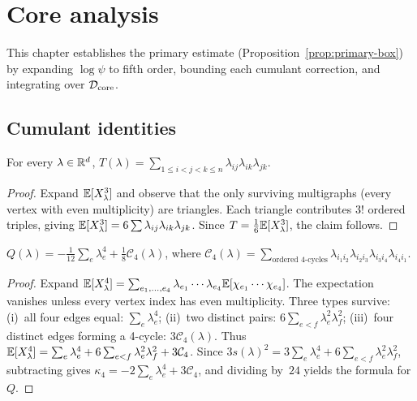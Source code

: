 \chapter{Core analysis}\label{chap:core}

This chapter establishes the primary estimate
(Proposition~\ref{prop:primary-box}) by expanding $\log\psi$ to fifth
order, bounding each cumulant correction, and integrating over $\mathcal{D}_\mathrm{core}$.

\section{Cumulant identities}

\begin{lemma}\label{lem:triangle}
\leanok
For every $\lambda\in\mathbb{R}^d$,
$T(\lambda)=\sum_{1\le i<j<k\le n}\lambda_{ij}\lambda_{ik}\lambda_{jk}$.
\end{lemma}

\begin{proof}\leanok
Expand $\mathbb{E}[X_\lambda^3]$ and observe that the only surviving multigraphs
(every vertex with even multiplicity) are triangles. Each triangle
contributes $3!$ ordered triples, giving $\mathbb{E}[X_\lambda^3]=6\sum\lambda_{ij}\lambda_{ik}\lambda_{jk}$.
Since $T=\frac16\mathbb{E}[X_\lambda^3]$, the claim follows.
\end{proof}

\begin{lemma}\label{lem:ordered-cycle}
\leanok
{}
$Q(\lambda)
=-\frac{1}{12}\sum_e\lambda_e^4+\frac18\mathcal{C}_4(\lambda)$,
where $\mathcal{C}_4(\lambda)=\sum_{\text{ordered 4-cycles}}\lambda_{i_1 i_2}\lambda_{i_2 i_3}\lambda_{i_3 i_4}\lambda_{i_4 i_1}$.
\end{lemma}

\begin{proof}\leanok
Expand $\mathbb{E}[X_\lambda^4]=\sum_{e_1,\dots,e_4}\lambda_{e_1}\cdots\lambda_{e_4}
\mathbb{E}[\chi_{e_1}\cdots\chi_{e_4}]$.
The expectation vanishes unless every vertex index has even multiplicity.
Three types survive:
(i)~all four edges equal: $\sum_e\lambda_e^4$;
(ii)~two distinct pairs: $6\sum_{e<f}\lambda_e^2\lambda_f^2$;
(iii)~four distinct edges forming a 4-cycle: $3\mathcal{C}_4(\lambda)$.
Thus $\mathbb{E}[X_\lambda^4]=\sum_e\lambda_e^4+6\sum_{e<f}\lambda_e^2\lambda_f^2
+3\mathcal{C}_4$.
Since $3s(\lambda)^2=3\sum_e\lambda_e^4+6\sum_{e<f}\lambda_e^2\lambda_f^2$,
subtracting gives $\kappa_4=-2\sum_e\lambda_e^4+3\mathcal{C}_4$, and
dividing by~$24$ yields the formula for $Q$.
\end{proof}


